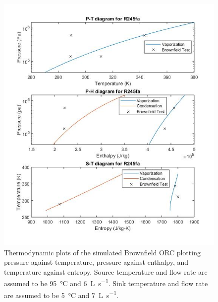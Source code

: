 \begin{figure}%
	\centering
	\caption{Thermodynamic plots of the simulated Brownfield ORC plotting pressure against temperature, pressure against enthalpy, and temperature against entropy. Source temperature and flow rate are assumed to be \SI{95}{\degreeCelsius} and \SI{6}{\liter\per\second}. Sink temperature and flow rate are assumed to be \SI{5}{\degreeCelsius} and \SI{7}{\liter\per\second}.}
	\label{fig:bf_themoplots}
	
	\includegraphics[width=\textwidth]{figures/BrownfieldThermoPlots}
\end{figure}